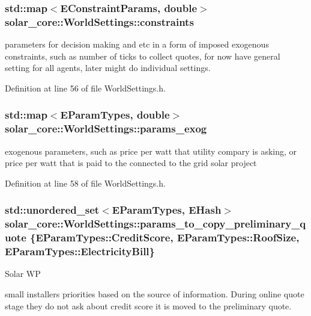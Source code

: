 \subsubsection[{constraints}]{\setlength{\rightskip}{0pt plus 5cm}std\+::map$<${\bf E\+Constraint\+Params}, double$>$ solar\+\_\+core\+::\+World\+Settings\+::constraints}\label{classsolar__core_1_1_world_settings_ab9108a4169d6508f8e03f0298088ac69}
parameters for decision making and etc in a form of imposed exogenous constraints, such as number of ticks to collect quotes, for now have general setting for all agents, later might do individual settings. 

Definition at line 56 of file World\+Settings.\+h.

\hypertarget{classsolar__core_1_1_world_settings_a2bf0de816c9c0b51e01e88b8ff0f779e}{}
\subsubsection[{params\+\_\+exog}]{\setlength{\rightskip}{0pt plus 5cm}std\+::map$<${\bf E\+Param\+Types}, double$>$ solar\+\_\+core\+::\+World\+Settings\+::params\+\_\+exog}\label{classsolar__core_1_1_world_settings_a2bf0de816c9c0b51e01e88b8ff0f779e}
exogenous parameters, such as price per watt that utility compary is asking, or price per watt that is paid to the connected to the grid solar project 

Definition at line 58 of file World\+Settings.\+h.

\hypertarget{classsolar__core_1_1_world_settings_a728f0b1c11f8ec1816d269aedc1cd80e}{}
\subsubsection[{params\+\_\+to\+\_\+copy\+\_\+preliminary\+\_\+quote}]{\setlength{\rightskip}{0pt plus 5cm}std\+::unordered\+\_\+set$<${\bf E\+Param\+Types}, {\bf E\+Hash}$>$ solar\+\_\+core\+::\+World\+Settings\+::params\+\_\+to\+\_\+copy\+\_\+preliminary\+\_\+quote \{{\bf E\+Param\+Types\+::\+Credit\+Score}, {\bf E\+Param\+Types\+::\+Roof\+Size}, {\bf E\+Param\+Types\+::\+Electricity\+Bill}\}}\label{classsolar__core_1_1_world_settings_a728f0b1c11f8ec1816d269aedc1cd80e}
\begin{DoxyRefDesc}{Solar W\+P}
\item[\hyperlink{wp__wp000008}{Solar W\+P}]small installers priorities based on the source of information. During online quote stage they do not ask about credit score it is moved to the preliminary quote. \end{DoxyRefDesc}


